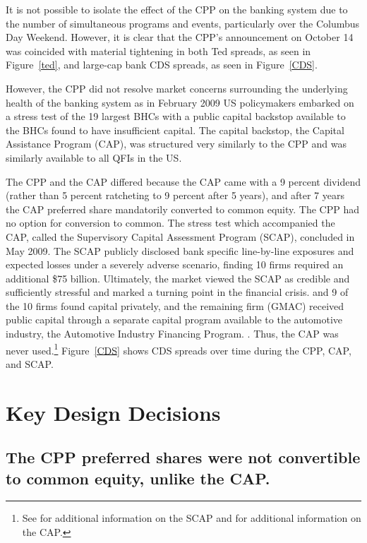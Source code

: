 \documentclass[12pt]{article}
\begin{document}
It is not possible to isolate the effect of the CPP on the banking system due to the number of simultaneous programs and events, particularly over the Columbus Day Weekend. However, it is clear that the CPP's announcement on October 14 was coincided with material tightening in both Ted spreads, as seen in Figure~\ref{ted}, and large-cap bank CDS spreads, as seen in Figure~\ref{CDS}. 

However, the CPP did not resolve market concerns surrounding the underlying health of the banking system as in February 2009 US policymakers embarked on a stress test of the 19 largest BHCs with a public capital backstop available to the BHCs found to have insufficient capital. The capital backstop, the Capital Assistance Program (CAP), was structured very similarly to the CPP and was similarly available to all QFIs in the US. 

The CPP and the CAP differed because the CAP came with a 9 percent dividend (rather than 5 percent ratcheting to 9 percent after 5 years), and after 7 years the CAP preferred share mandatorily converted to common equity. The CPP had no option for conversion to common. The stress test which accompanied the CAP, called the Supervisory Capital Assessment Program (SCAP), concluded in May 2009. The SCAP publicly disclosed bank specific line-by-line exposures and expected losses under a severely adverse scenario, finding 10 firms required an additional \$75 billion. Ultimately, the market viewed the SCAP as credible and sufficiently stressful and marked a turning point in the financial crisis. \citep{Bernanke} and \citep{Geithner} 9 of the 10 firms found capital privately, and the remaining firm (GMAC) received public capital through a separate capital program available to the automotive industry, the Automotive Industry Financing Program. \citep{Ross2016a}. Thus, the CAP was never used.\footnote{See \citet{Ross2016a} for additional information on the SCAP and \citet{Ross2016b} for additional information on the CAP.} Figure~\ref{CDS} shows CDS spreads over time during the CPP, CAP, and SCAP.

\section{Key Design Decisions} 

\subsection{The CPP preferred shares were not convertible to common equity, unlike the CAP.}
\end{document}
